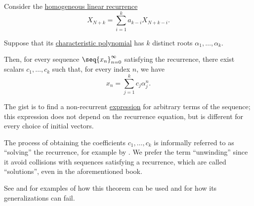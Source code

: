 \begin{theorem}\label{thm:linear_recurrence_unwinding}
  Consider the \hyperref[def:homogeneous_linear_recurrence]{homogeneous linear recurrence}
  \begin{equation*}
    X_{N+k} = \sum_{i=1}^k a_{k-i} X_{N+k-i}.
  \end{equation*}

  Suppose that its \hyperref[def:linear_recurrence_characteristic_polynomial]{characteristic polynomial} has \( k \) distinct roots \( \alpha_1, \ldots, \alpha_k \).

  Then, for every sequence \( \seq{ x_n }_{n=0}^\infty \) satisfying the recurrence, there exist scalars \( c_1, \ldots, c_k \) such that, for every index \( n \), we have
  \begin{equation}\label{eq:thm:linear_recurrence_unwinding}
    x_n = \sum_{j=1}^k c_j \alpha_j^n.
  \end{equation}
\end{theorem}
\begin{comments}
  \item The gist is to find a non-recurrent \hyperref[con:expression]{expression} for arbitrary terms of the sequence; this expression does not depend on the recurrence equation, but is different for every choice of initial vectors.

  \item The process of obtaining the coefficients \( c_1, \ldots, c_k \) is informally referred to as \enquote{solving} the recurrence, for example by . We prefer the term \enquote{unwinding} since it avoid collisions with sequences satisfying a recurrence, which are called \enquote{solutions}, even in the aforementioned book.

  \item See  and  for examples of how this theorem can be used and  for how its generalizations can fail.
\end{comments}
